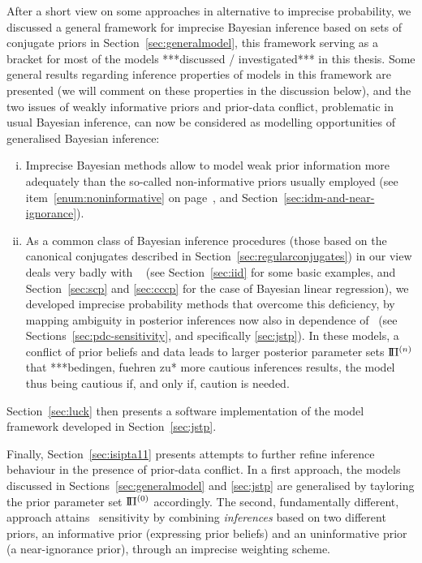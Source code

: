 After a short view on some approaches in alternative to imprecise probability,
we discussed a general framework for imprecise Bayesian inference
based on sets of conjugate priors in Section~\ref{sec:generalmodel},
this framework serving as a bracket for most of the models ***discussed / investigated*** in this thesis.
Some general results regarding inference properties of models
in this framework are presented (we will comment on these properties in the discussion below),
and the two issues of weakly informative priors and prior-data conflict,
problematic in usual Bayesian inference,
can now be considered as modelling opportunities of generalised Bayesian inference:
\begin{enumerate}[(i)]
\item Imprecise Bayesian methods allow to model weak prior information
more adequately than the so-called non-informative priors usually employed 
(see item~\ref{enum:noninformative} on page~\pageref{enum:noninformative}, and Section~\ref{sec:idm-and-near-ignorance}).
\item As a common class of Bayesian inference procedures
(those based on the canonical conjugates described in Section~\ref{sec:regularconjugates})
in our view deals very badly with \pdc\ %
(see Section~\ref{sec:iid} for some basic examples, and
Section~\ref{sec:scp} and \ref{sec:cccp} for the case of Bayesian linear regression),
we developed imprecise probability methods that overcome this deficiency,
by mapping ambiguity in posterior inferences now also in dependence of \pdc\ 
(see Sections~\ref{sec:pdc-sensitivity}, and specifically \ref{sec:jstp}).
In these models, a conflict of prior beliefs and data
leads to larger posterior parameter sets $\text{I}\!\Pi^{(n)}$
that ***bedingen, fuehren zu* more cautious inferences results,
the model thus being cautious if, and only if, caution is needed.
\end{enumerate}
Section~\ref{sec:luck} then presents a software implementation
of the model framework developed in Section~\ref{sec:jstp}.

Finally, Section~\ref{sec:isipta11} presents attempts to further refine
inference behaviour in the presence of prior-data conflict.
In a first approach, the models discussed in Sections~\ref{sec:generalmodel} and \ref{sec:jstp}
are generalised by tayloring the prior parameter set $\text{I}\!\Pi^{(0)}$ accordingly.
The second, fundamentally different, approach attains \pdc\ sensitivity
by combining \emph{inferences} based on two different priors,
an informative prior (expressing prior beliefs) and an uninformative prior (a near-ignorance prior),
through an imprecise weighting scheme.

